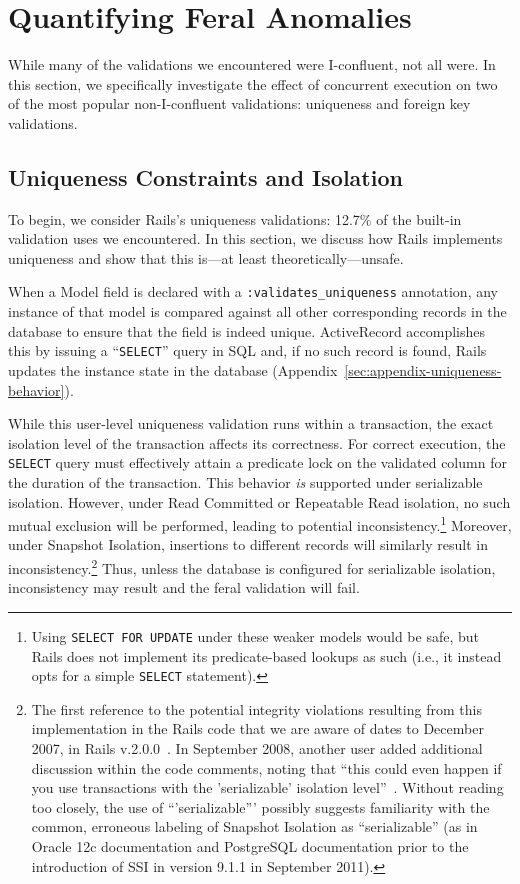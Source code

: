 
\section{Quantifying Feral Anomalies}
\label{sec:evaluation}

While many of the validations we encountered were I-confluent,
not all were. In this section, we specifically investigate the effect
of concurrent execution on two of the most popular non-I-confluent
validations: uniqueness and foreign key validations.

\subsection{Uniqueness Constraints and Isolation}

To begin, we consider Rails's uniqueness validations: 12.7\% of the
built-in validation uses we encountered. In this section, we discuss
how Rails implements uniqueness and show that this is---at least
theoretically---unsafe.

When a Model field is declared with a \texttt{:validates\_uniqueness}
annotation, any instance of that model is compared against all other
corresponding records in the database to ensure that the field is
indeed unique. ActiveRecord accomplishes this by issuing a
``\texttt{SELECT}'' query in SQL and, if no such record is found,
Rails updates the instance state in the database
(Appendix~\ref{sec:appendix-uniqueness-behavior}).

While this user-level uniqueness validation runs within a transaction,
the exact isolation level of the transaction affects its
correctness. For correct execution, the \texttt{SELECT} query must
effectively attain a predicate lock on the validated column for the
duration of the transaction. This behavior \textit{is} supported under
serializable isolation. However, under Read Committed or Repeatable
Read isolation, no such mutual exclusion will be performed, leading to
potential inconsistency.\footnote{Using \texttt{SELECT FOR UPDATE}
  under these weaker models would be safe, but Rails does not
  implement its predicate-based lookups as such (i.e., it instead opts
  for a simple \texttt{SELECT} statement).}  Moreover, under Snapshot Isolation,
insertions to different records will similarly result in
inconsistency.\footnote{The first reference to the potential integrity
  violations resulting from this implementation in the Rails code that
  we are aware of dates to December 2007, in Rails
  v.2.0.0~\cite{code-unique-race-one}.  In September 2008, another
  user added additional discussion within the code comments, noting
  that ``this could even happen if you use transactions with the
  'serializable' isolation
  level''~\cite{code-unique-race-two}. Without reading too closely,
  the use of ``'serializable''' possibly suggests familiarity with the
  common, erroneous labeling of Snapshot Isolation as ``serializable''
  (as in Oracle 12c documentation and PostgreSQL documentation prior
  to the introduction of SSI in version 9.1.1 in September
  2011)\label{fn:si-rails}. } Thus, unless the database is configured
for serializable isolation, inconsistency may result and the feral
validation will fail.

